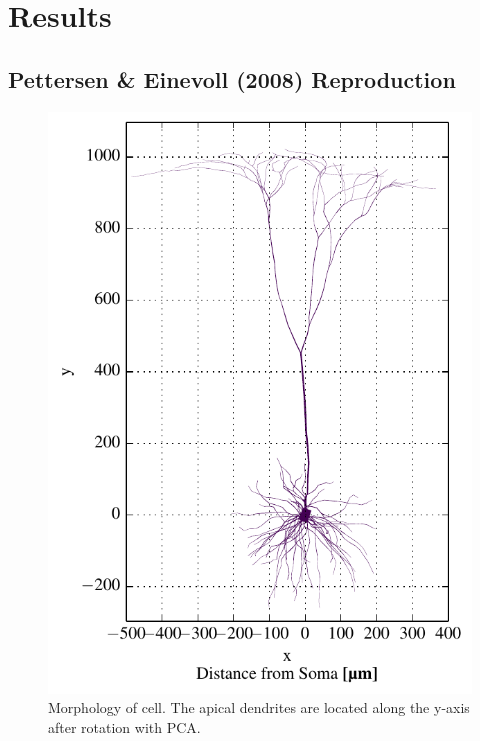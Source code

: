 \documentclass[altfont, fleqn]{uiophd}
\begin{document}
\chapter{Results}

\vspace{1em} 
\startcontents
{}

\section{Pettersen \& Einevoll (2008) Reproduction}
\begin{figure}
    \vspace{-20pt}
    \begin{center}
        \includegraphics[width=\linewidth]{images/4_1/morph_xy_up.pdf}
        \vspace{-20pt}
        \caption{%
            Morphology of \textcite{mainen_influence_1996} cell. 
            The apical dendrites are located along the y-axis after rotation
            with PCA.}
        \label{fig:4_1_morph}
        \vspace{-10pt}
    \end{center}
\end{figure}
\end{document}
